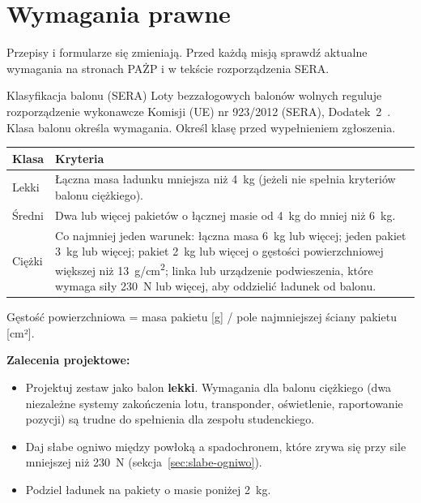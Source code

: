 \chapter{Wymagania prawne}\label{ch:prawo}

\begin{uwaga}Przepisy i formularze się zmieniają. Przed każdą misją sprawdź aktualne wymagania na stronach PAŻP i w tekście rozporządzenia SERA.\end{uwaga}

\begin{sekcja}{Klasyfikacja balonu (SERA)}
Loty bezzałogowych balonów wolnych reguluje rozporządzenie wykonawcze Komisji (UE) nr 923/2012 (SERA), Dodatek~2~\cite{sera}. Klasa balonu określa wymagania. Określ klasę przed wypełnieniem zgłoszenia.

\renewcommand{\arraystretch}{1.35}
\begin{tabularx}{\linewidth}{@{}P{20mm}L@{}}
\toprule
\textbf{Klasa} & \textbf{Kryteria}\\\midrule
Lekki & Łączna masa ładunku mniejsza niż \SI{4}{kg} (jeżeli nie spełnia kryteriów balonu ciężkiego).\\
Średni & Dwa lub więcej pakietów o łącznej masie od \SI{4}{kg} do mniej niż \SI{6}{kg}.\\
Ciężki & Co najmniej jeden warunek: łączna masa \SI{6}{kg} lub więcej; jeden pakiet \SI{3}{kg} lub więcej; pakiet \SI{2}{kg} lub więcej o gęstości powierzchniowej większej niż \SI{13}{g/cm^2}; linka lub urządzenie podwieszenia, które wymaga siły \SI{230}{N} lub więcej, aby oddzielić ładunek od balonu.\\
\bottomrule
\end{tabularx}

Gęstość powierzchniowa = masa pakietu [g] / pole najmniejszej ściany pakietu [cm²].

\textbf{Zalecenia projektowe:}
\begin{itemize}
  \item Projektuj zestaw jako balon \textbf{lekki}. Wymagania dla balonu ciężkiego (dwa niezależne systemy zakończenia lotu, transponder, oświetlenie, raportowanie pozycji) są trudne do spełnienia dla zespołu studenckiego.
  \item Daj słabe ogniwo między powłoką a spadochronem, które zrywa się przy sile mniejszej niż \SI{230}{N} (sekcja~\ref{sec:slabe-ogniwo}).
  \item Podziel ładunek na pakiety o masie poniżej \SI{2}{kg}.
\end{itemize}
\end{sekcja}

